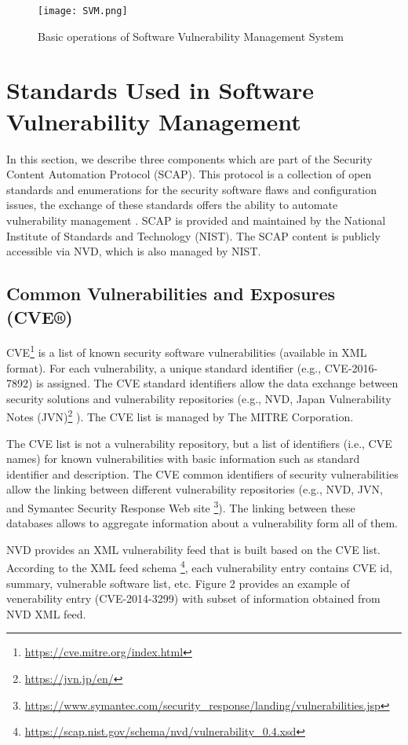 \documentclass{llncs}
\begin{document}
\begin{figure}
 
  \centering
    \texttt{[image: SVM.png]}
     \caption{Basic operations of Software Vulnerability Management System}
\end{figure}

\section{Standards	Used	in	Software	Vulnerability	Management}
 
 In	this section, we describe three	components which are part of the Security	 Content	Automation	Protocol (SCAP). This protocol is a collection of open standards and enumerations for the	security  software flaws	 and configuration issues, the exchange of these	standards	offers	the	ability	to	automate	vulnerability	management \cite{scap_doc}.		
 SCAP is provided	and	maintained	by	the	National	Institute	of	Standards	and	Technology (NIST). The SCAP	content	is	publicly accessible via  NVD, which is also managed	by NIST.
 
 
 \subsection{Common Vulnerabilities and Exposures (CVE®)} 
 CVE\footnote{\url{https://cve.mitre.org/index.html}} is a list of known security software vulnerabilities (available in XML format). For each vulnerability, a unique standard identifier (e.g., CVE-2016-7892) is assigned. The CVE standard identifiers allow the data exchange between security solutions and vulnerability repositories (e.g., NVD, Japan Vulnerability Notes (JVN)\footnote{\url{https://jvn.jp/en/}} ). The CVE list is managed by The MITRE Corporation.

 The CVE list is not a vulnerability repository, but a list of identifiers (i.e., CVE names) for  known vulnerabilities with basic information such as standard identifier and description. The CVE common identifiers of security vulnerabilities allow the linking between different vulnerability repositories (e.g., NVD, JVN, and Symantec Security Response Web site \footnote{\url{https://www.symantec.com/security_response/landing/vulnerabilities.jsp}}). The linking between these databases allows to aggregate information about a vulnerability form all of them. 
 
 NVD provides an XML vulnerability feed that is built based on the CVE list. According to the XML feed schema \footnote{\url{https://scap.nist.gov/schema/nvd/vulnerability_0.4.xsd}}, each vulnerability entry contains CVE id, summary, vulnerable software list, etc. Figure 2 provides an example of venerability entry (CVE-2014-3299) with subset of information obtained from NVD XML feed.
\end{document}
